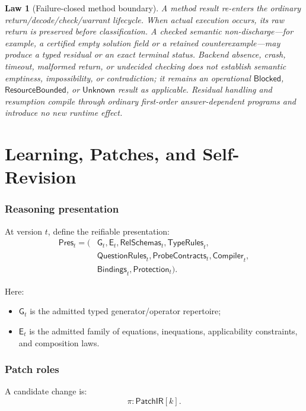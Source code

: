 \documentclass[11pt,oneside]{article}
\newtheorem{law}[definition]{Law}
\newcommand{\PatchIR}{\mathsf{PatchIR}}
\begin{document}
\begin{law}[Failure-closed method boundary]\label{law:method-residual}
A method result re-enters the ordinary return/decode/check/warrant lifecycle.  When
actual execution occurs, its raw return is preserved before classification.  A checked
semantic non-discharge---for example, a certified empty solution field or a retained
counterexample---may produce a typed residual or an exact terminal status.  Backend
absence, crash, timeout, malformed return, or undecided checking does not establish
semantic emptiness, impossibility, or contradiction; it remains an operational
\(\mathsf{Blocked}\), \(\mathsf{ResourceBounded}\), or \(\mathsf{Unknown}\) result as
applicable.  Residual handling and resumption compile through ordinary first-order
answer-dependent programs and introduce no new runtime effect.
\end{law}

\part{Learning, Patches, and Self-Revision}

\section{Reasoning presentation}

At version \(t\), define the reifiable presentation:
\[
\boxed{
\begin{aligned}
\mathsf{Pres}_t
=(&\mathsf G_t,\mathsf E_t,\mathsf{RelSchemas}_t,\mathsf{TypeRules}_t,\\
 &\mathsf{QuestionRules}_t,\mathsf{ProbeContracts}_t,\mathsf{Compiler}_t,\\
 &\mathsf{Bindings}_t,\mathsf{Protection}_t).
\end{aligned}
}
\]

Here:
\begin{itemize}
\item \(\mathsf G_t\) is the admitted typed generator/operator repertoire;
\item \(\mathsf E_t\) is the admitted family of equations, inequations, applicability constraints, and composition laws.
\end{itemize}

\section{Patch roles}

A candidate change is:
\[
\boxed{
\pi:\PatchIR[k].
}
\]
\end{document}
